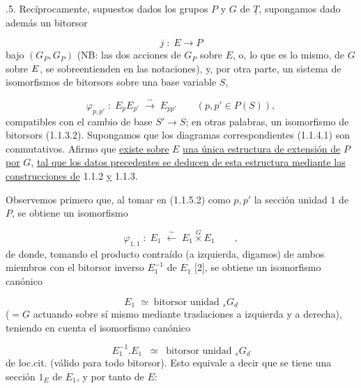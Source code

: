\par\medskip{}.5.  Recíprocamente, supuestos dados los grupos $P$ y $G$ de
$\underline{T}$, supongamos dado además un bitorsor

\begin{equation}\tag{1.1.5.1}
j \; : \; E \longrightarrow P
\end{equation}
bajo $(G_{P},G_{P})$ (NB: las dos acciones de $G_{P}$ sobre $E$, o,
lo que es lo mismo, de $G$ sobre $\sisi{P}{E}$, se sobreentienden en las
notaciones), y, por otra parte, un sistema de isomorfismos de bitorsors
sobre una base variable $S$,

\begin{equation}\tag{1.1.5.2}
\varphi_{p,p'} \; : \; E_{p}E_{p'} \;\overset{\sim}{\longrightarrow}\; E_{pp'} \qquad (p,p' \in P(S)),
\end{equation}
compatibles con el cambio de base $S' \longrightarrow S$; en otras
palabras, un isomorfismo de bitorsors (1.1.3.2). Supongamos que los
diagramas correspondientes (1.1.4.1) son conmutativos. Afirmo que
\underline{existe sobre} $E$ \underline{una única estructura de
extensión de} $P$ \underline{por} $G$, \underline{tal que los datos
precedentes se deducen de esta estructura mediante las construcciones
de} 1.1.2 \underline{y} 1.1.3.

Observemos primero que, al tomar en (1.1.5.2) como $p,p'$ la sección
unidad $1$ de $P$, se obtiene un isomorfismo

\begin{equation}\tag{1.1.5.3}
\varphi_{1,1} \; : \; E_{1} \;\overset{\sim}{\longleftarrow}\; E_{1} \overset{G}{\times} E_{1} \qquad ,
\end{equation}
de donde, tomando el producto contraído (a izquierda, digamos) de ambos
miembros con el bitorsor inverso $E_{1}^{-1}$ de $E_{1}$ [2], se obtiene
un isomorfismo canónico

\begin{equation}\tag{1.1.5.4}
E_{1} \;\simeq\; \text{bitorsor unidad } {}_{s}G_{d}
\end{equation}
($=G$ actuando sobre sí mismo mediante traslaciones a izquierda y a
derecha), teniendo en cuenta
el isomorfismo canónico

\begin{equation*}
E_1^{-1}.E_1 \;\; \simeq \;\; \text{bitorsor unidad } {}_sG_d
\end{equation*}
de loc.cit. (válido para todo bitorsor). Esto equivale a decir que se
tiene una sección $1_E$ de $E_1$, y por tanto de $E$:

